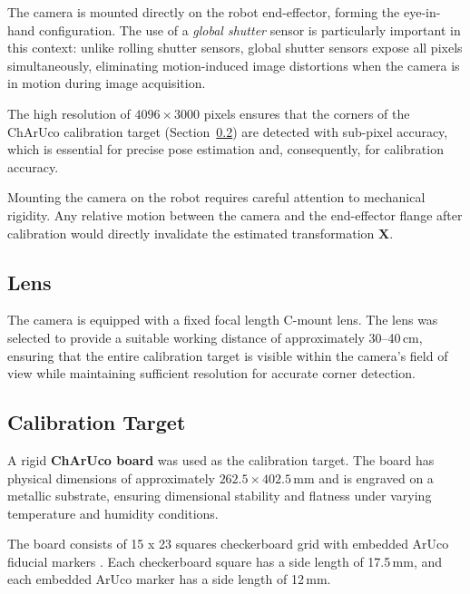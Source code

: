 The camera is mounted directly on the robot end-effector, forming the
eye-in-hand configuration. The use of a \textit{global shutter} sensor is
particularly important in this context: unlike rolling shutter sensors, global
shutter sensors expose all pixels simultaneously, eliminating motion-induced
image distortions when the camera is in motion during image acquisition.

The high resolution of $4096 \times 3000$ pixels ensures that the corners of
the ChArUco calibration target (Section~\ref{subsec:calibration_target}) are
detected with sub-pixel accuracy, which is essential for precise pose estimation
and, consequently, for calibration accuracy.

Mounting the camera on the robot requires careful attention to mechanical
rigidity. Any relative motion between the camera and the end-effector flange
after calibration would directly invalidate the estimated transformation
$\mathbf{X}$. 

\subsection{Lens}
\label{subsec:lens}

The camera is equipped with a fixed focal length C-mount lens.
The lens was selected to provide a suitable working distance of approximately
30--40\,cm, ensuring that the entire calibration target is visible within the
camera's field of view while maintaining sufficient resolution for accurate
corner detection.

\subsection{Calibration Target}
\label{subsec:calibration_target}

A rigid \textbf{ChArUco board} \cite{garrido2014aruco} was used as the
calibration target. The board has physical dimensions of approximately
$262.5 \times 402.5$\,mm and is engraved on a metallic substrate, ensuring
dimensional stability and flatness under varying temperature and humidity
conditions.


The board consists of 15 x 23 squares checkerboard grid with embedded ArUco
fiducial markers \cite{garrido2014aruco}. Each checkerboard square has a side
length of 17.5\,mm, and each embedded ArUco marker has a side
length of 12\,mm.

